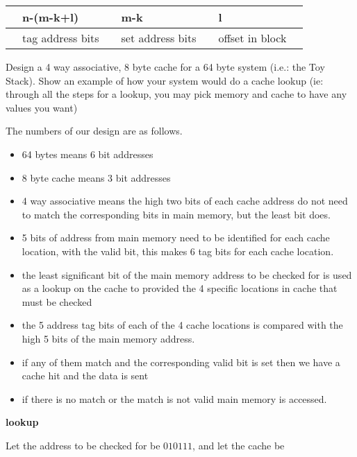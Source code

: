 \begin{tabular}{@{}clclclc@{}}
 & n-(m-k+l) && m-k && l & \\ \hline
\vline &  tag address bits & \vline & set address bits & \vline & offset in block & \vline \\ \hline
\end{tabular}

\vspace{.1in}

Design a 4 way associative, 8 byte cache for a 64 byte system (i.e.: the Toy Stack).  Show an example of how your system would do a cache lookup (ie: through all the steps for a lookup, you may pick memory and cache to have any values you want)

    {\color{ans}
    The numbers of our design are as follows.
    \begin{itemize}
        \item 64 bytes means 6 bit addresses
        \item 8 byte cache means 3 bit addresses
        \item 4 way associative means the high two bits of each cache address do not need to match the corresponding bits in main memory, but the least bit does.
        \item 5 bits of address from main memory need to be identified for each cache location, with the valid bit, this makes 6 tag bits for each cache location.
        \item the least significant bit of the main memory address to be checked for is used as a lookup on the cache to provided the 4 specific locations in cache that must be checked
        \item the 5 address tag bits of each of the 4 cache locations is compared with the high 5 bits of the main memory address.
        \item if any of them match and the corresponding valid bit is set then we have a cache hit and the data is sent
        \item if there is no match or the match is not valid main memory is accessed.
    \end{itemize}


    \textbf{lookup}

    Let the address to be checked for be $010111$, and let the cache be

}
